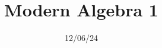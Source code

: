 \documentclass[11pt, letterpaper]{report}
\title{Modern Algebra 1}
\date{12/06/24}
\begin{document}
\makeproblem
\end{document}
